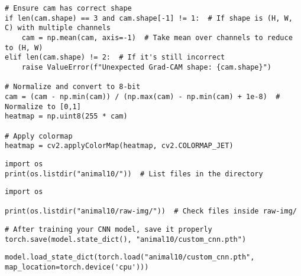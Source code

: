 \begin{verbatim}
# Ensure cam has correct shape
if len(cam.shape) == 3 and cam.shape[-1] != 1:  # If shape is (H, W, C) with multiple channels
    cam = np.mean(cam, axis=-1)  # Take mean over channels to reduce to (H, W)
elif len(cam.shape) != 2:  # If it's still incorrect
    raise ValueError(f"Unexpected Grad-CAM shape: {cam.shape}")

# Normalize and convert to 8-bit
cam = (cam - np.min(cam)) / (np.max(cam) - np.min(cam) + 1e-8)  # Normalize to [0,1]
heatmap = np.uint8(255 * cam)

# Apply colormap
heatmap = cv2.applyColorMap(heatmap, cv2.COLORMAP_JET)

\end{verbatim}

\begin{verbatim}
import os
print(os.listdir("animal10/"))  # List files in the directory

\end{verbatim}

\begin{verbatim}
import os

print(os.listdir("animal10/raw-img/"))  # Check files inside raw-img/

\end{verbatim}

\begin{verbatim}
# After training your CNN model, save it properly
torch.save(model.state_dict(), "animal10/custom_cnn.pth")

\end{verbatim}

\begin{verbatim}
model.load_state_dict(torch.load("animal10/custom_cnn.pth", map_location=torch.device('cpu')))

\end{verbatim}

